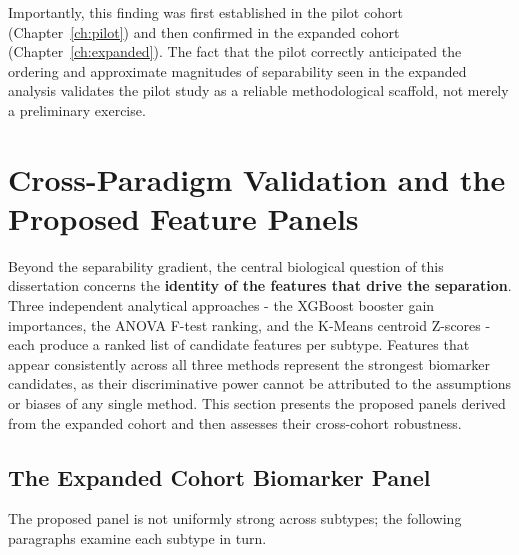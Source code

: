 Importantly, this finding was first established in the pilot cohort (Chapter~\ref{ch:pilot})
and then confirmed in the expanded cohort (Chapter~\ref{ch:expanded}). The fact that
the pilot correctly anticipated
the ordering and approximate magnitudes of separability seen in the expanded analysis
validates the pilot study as a reliable methodological scaffold, not merely a
preliminary exercise.
 
\section{Cross-Paradigm Validation and the Proposed Feature Panels}
\label{sec:disc_panels}
 
Beyond the separability gradient, the central biological question of this dissertation
concerns the \textbf{identity of the features that drive the separation}. Three
independent analytical approaches - the XGBoost booster gain importances, the ANOVA
F-test ranking, and the K-Means centroid Z-scores - each produce a ranked list of
candidate features per subtype. Features that appear consistently across all three
methods represent the strongest biomarker candidates, as their discriminative power
cannot be attributed to the assumptions or biases of any single method. This section
presents the proposed panels derived from the expanded cohort and then assesses their
cross-cohort robustness.
 
\subsection{The Expanded Cohort Biomarker Panel}
\label{subsec:disc_expanded_panel}

The proposed panel is not uniformly strong across subtypes; the following paragraphs
examine each subtype in turn.
 
